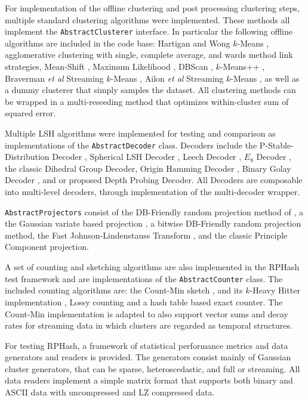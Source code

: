 For implementation of the offline clustering and post processing clustering steps, multiple standard clustering
algorithms were implemented. These methods all implement the \texttt{AbstractClusterer} interface.  
In particular the following offline algorithms are included in the code base: Hartigan and
Wong $k$-Means \cite{Hartigan}, agglomerative clustering with single, complete average, and wards method link strategies,
Mean-Shift \cite{comaniciu-02}, Maximum Likelihood \cite{Hathaway}, DBScan \cite{dbscan}, $k$-Means++ \cite{arthur-07}, Braverman
\emph{et al} Streaming $k$-Means \cite{braverman} , Ailon \emph{et al} Streaming $k$-Means \cite{streamkmeans}, as well as a
dummy clusterer that simply samples the dataset.  All clustering methods can be wrapped in a multi-reseeding method that
optimizes within-cluster sum of squared error.

Multiple LSH algorithms were implemented for testing and comparison as implementations of the \texttt{AbstractDecoder} class. Decoders include 
the P-Stable-Distribution Decoder \cite{datar-04},
Spherical LSH Decoder \cite{SLSH}, Leech Decoder \cite{Andoni06,Amrani}, $E_8$ Decoder \cite{SPLAG}, the classic Dihedral Group Decoder\cite{SPLAG}, 
Origin Hamming Decoder \cite{indyk-98}, Binary Golay Decoder \cite{Amrani}, and or proposed Depth Probing Decoder.  All Decoders are composable into
multi-level decoders, through implementation of the multi-decoder wrapper.

\texttt{AbstractProjectors} consist of the DB-Friendly random projection method of \cite{Achlioptas01}, a the Gaussian variate based
projection \cite{vempala}, a bitwise DB-Friendly random projection method, the Fast
Johnson-Lindenstauss Transform \cite{ailon2006}, and the classic Principle Component projection.  

A set of counting and sketching
algorithms are also implemented in the \textsf{RPHash} test framework and are implementations of the \texttt{AbstractCounter} class.  
The included counting algorithms are: the Count-Min sketch \cite{cormode},
and its $k$-Heavy Hitter implementation \cite{cormode2}, Lossy counting \cite{morris-78} and a hash table based exact counter.  The
Count-Min implementation is adapted to also support vector sums and decay rates for streaming data in which clusters are regarded as
temporal structures.

For testing \textsf{RPHash}, a framework of statistical performance metrics and data generators and readers is provided.  The
generators consist mainly of Gaussian cluster generators, that can be sparse, heteroscedastic, and full or streaming.
All data readers implement a simple matrix format that supports both binary and ASCII data with uncompressed and LZ
compressed data.


